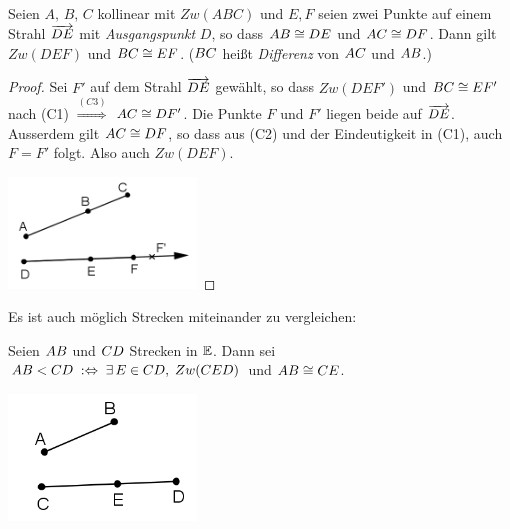 \begin{thm}  \label{thm:satz.s1f}
Seien $A,\,B,\,C$ kollinear mit $Zw(ABC)$ und
$E,F$ seien zwei Punkte auf einem Strahl $\mbox{${\overrightarrow{DE}}$}$ mit {\em Ausgangspunkt} $D$,
so dass ${AB}\cong{DE}$ und
${AC}\cong{DF}$. Dann gilt
$Zw(DEF)$ und ${BC}\cong{EF}$.
(${BC}$ hei{\ss}t \emph{Differenz} von ${AC}$ und ${AB}$.)
\end{thm}



\begin{proof}
    Sei $F'$ auf dem Strahl $\mbox{${\overrightarrow{DE}}$}$ gewählt, so dass $Zw(DEF')$ und
    ${BC}\cong{EF'}$ nach (C1)
    $\stackrel{(C3)}{\Longrightarrow}$ ${AC}\cong{DF'}$.
    Die Punkte $F$ und $F'$ liegen beide auf $\mbox{${\overrightarrow{DE}}$}$. Ausserdem gilt
     ${AC}\cong{DF}$, so dass aus (C2) und der Eindeutigkeit
     in  (C1), auch $F=F'$ folgt. Also auch $Zw(DEF)$.

\centerline{\includegraphics[width=5cm]{BILDER/1-2-04-Diff.png}}

\end{proof}


Es ist auch möglich Strecken miteinander zu vergleichen:

    \begin{defi} Seien
    ${AB}$ und ${CD}$ Strecken in $\mathbb E$. Dann sei
    ${AB}<{CD}\;:\Leftrightarrow\;\exists\,E\in{CD},\;Zw(CED)$
    und  ${AB}\cong{CE}$.
    \end{defi}


\centerline{\includegraphics[width=5cm]{BILDER/1-2-05-Ord.png}}




